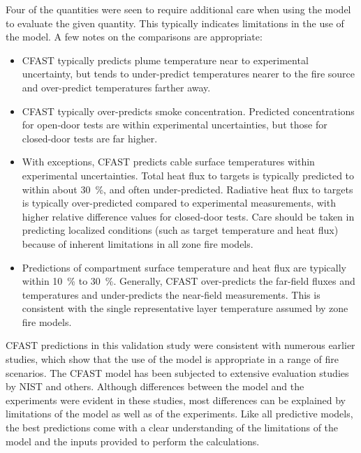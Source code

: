 Four of the quantities were seen to require additional care when using the model to evaluate the given quantity.  This typically indicates limitations in the use of the model.  A few notes on the comparisons are appropriate:

\begin{itemize}
\item CFAST typically predicts plume temperature near to experimental uncertainty, but tends to under-predict temperatures nearer to the fire source and over-predict temperatures farther away.
\item CFAST typically over-predicts smoke concentration.  Predicted concentrations for open-door tests are within experimental uncertainties, but those for closed-door tests are far higher.
\item With exceptions, CFAST predicts cable surface temperatures within experimental uncertainties.  Total heat flux to targets is typically predicted to within about 30~\%, and often under-predicted.  Radiative heat flux to targets is typically over-predicted compared to experimental measurements, with higher relative difference values for closed-door tests.  Care should be taken in predicting localized conditions (such as target temperature and heat flux) because of inherent limitations in all zone fire models.
\item Predictions of compartment surface temperature and heat flux are typically within 10~\% to 30~\%.  Generally, CFAST over-predicts the far-field fluxes and temperatures and under-predicts the near-field measurements.  This is consistent with the single representative layer temperature assumed by zone fire models.
\end{itemize}

CFAST predictions in this validation study were consistent with numerous earlier studies, which show that the use of the model is appropriate in a range of fire scenarios.  The CFAST model has been subjected to extensive evaluation studies by NIST and others.  Although differences between the model and the experiments were evident in these studies, most differences can be explained by limitations of the model as well as of the experiments.  Like all predictive models, the best predictions come with a clear understanding of the limitations of the model and the inputs provided to perform the calculations.